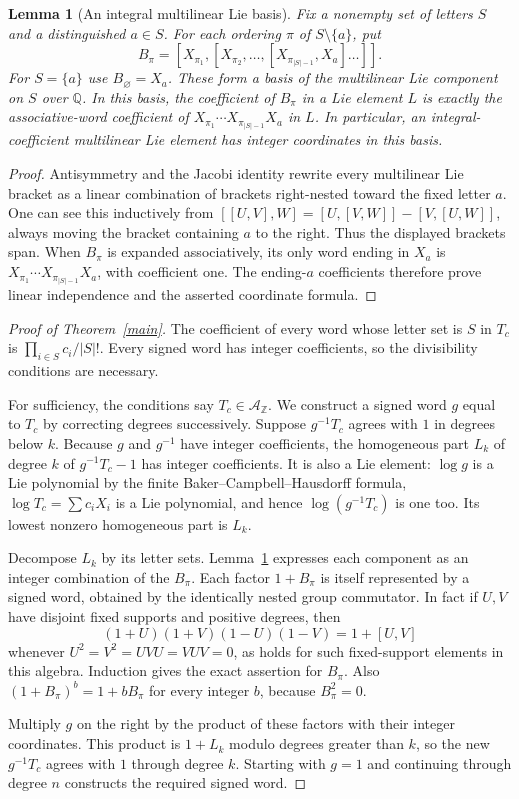 \documentclass[11pt]{article}
\newtheorem{lemma}[theorem]{Lemma}
\newcommand{\A}{\mathcal A}
\begin{document}
\begin{lemma}[An integral multilinear Lie basis]\label{basis}
Fix a nonempty set of letters $S$ and a distinguished $a\in S$.
For each ordering $\pi$ of $S\setminus\{a\}$, put
\[
 B_\pi=[X_{\pi_1},[X_{\pi_2},\ldots,
                     [X_{\pi_{|S|-1}},X_a]\ldots]].
\]
For $S=\{a\}$ use $B_\varnothing=X_a$.
These form a basis of the multilinear Lie component on $S$ over
$\mathbb Q$. In this basis, the coefficient of $B_\pi$ in a Lie element
$L$ is exactly the associative-word coefficient of
$X_{\pi_1}\cdots X_{\pi_{|S|-1}}X_a$ in $L$.
In particular, an integral-coefficient multilinear Lie element has
integer coordinates in this basis.
\end{lemma}
\begin{proof}
Antisymmetry and the Jacobi identity rewrite every multilinear Lie
bracket as a linear combination of brackets right-nested toward the
fixed letter $a$. One can see this inductively from
$[[U,V],W]=[U,[V,W]]-[V,[U,W]]$, always moving the bracket containing
$a$ to the right. Thus the displayed brackets span.
When $B_\pi$ is expanded associatively, its only word ending in $X_a$
is $X_{\pi_1}\cdots X_{\pi_{|S|-1}}X_a$, with coefficient one.
The ending-$a$ coefficients therefore prove linear independence and
the asserted coordinate formula.
\end{proof}

\begin{proof}[Proof of Theorem~\ref{main}]
The coefficient of every word whose letter set is $S$ in $T_c$ is
$\prod_{i\in S}c_i/|S|!$. Every signed word has integer coefficients,
so the divisibility conditions are necessary.

For sufficiency, the conditions say $T_c\in\A_{\mathbb Z}$.
We construct a signed word $g$ equal to $T_c$ by correcting degrees
successively. Suppose $g^{-1}T_c$ agrees with $1$ in degrees below $k$.
Because $g$ and $g^{-1}$ have integer coefficients, the homogeneous
part $L_k$ of degree $k$ of $g^{-1}T_c-1$ has integer coefficients.
It is also a Lie element: $\log g$ is a Lie polynomial by the finite
Baker--Campbell--Hausdorff formula, $\log T_c=\sum c_iX_i$ is a Lie
polynomial, and hence $\log(g^{-1}T_c)$ is one too. Its lowest
nonzero homogeneous part is $L_k$.

Decompose $L_k$ by its letter sets. Lemma~\ref{basis} expresses each
component as an integer combination of the $B_\pi$.
Each factor $1+B_\pi$ is itself represented by a signed word, obtained
by the identically nested group commutator. In fact if $U,V$ have
disjoint fixed supports and positive degrees, then
\[
 (1+U)(1+V)(1-U)(1-V)=1+[U,V]
\]
whenever $U^2=V^2=UVU=VUV=0$, as holds for such fixed-support elements
in this algebra. Induction gives the exact assertion for $B_\pi$.
Also $(1+B_\pi)^b=1+bB_\pi$ for every integer $b$, because
$B_\pi^2=0$.

Multiply $g$ on the right by the product of these factors with their
integer coordinates. This product is $1+L_k$ modulo degrees greater
than $k$, so the new $g^{-1}T_c$ agrees with $1$ through degree $k$.
Starting with $g=1$ and continuing through degree $n$ constructs the
required signed word.
\end{proof}
\end{document}
